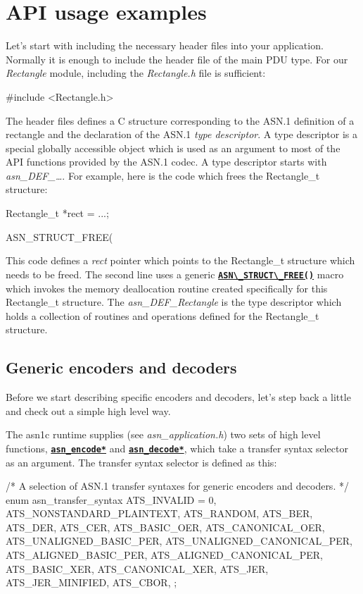 \documentclass[english,oneside,12pt]{book}
\newcommand{\api}[2]{\hyperref[#1]{\code{#2}}}
\newcommand{\code}[1]{\texttt{\textbf{\lstinline{#1}}}}
\begin{document}
\chapter{API usage examples}

Let's start with including the necessary header files into your
application. Normally it is enough to include the header file of
the main PDU type. For our \emph{Rectangle} module, including the \emph{Rectangle.h} file is sufficient:
\begin{codesample}
#include <Rectangle.h>
\end{codesample}
The header files defines a C structure corresponding to the ASN.1
definition of a rectangle and the declaration of the ASN.1
\emph{type descriptor}. A type descriptor is a special globally accessible
object which is used as an argument to most of the API functions provided by
the ASN.1 codec. A type descriptor starts with \emph{asn\_DEF\_\ldots{}}. For example, here is the code which frees the Rectangle\_t structure:
\begin{codesample}
Rectangle_t *rect = ...;

ASN_STRUCT_FREE(%
\end{codesample}
This code defines a \emph{rect} pointer which points to the Rectangle\_t
structure which needs to be freed. The second line uses a generic
\api{sec:ASN_STRUCT_FREE}{ASN\_STRUCT\_FREE()} macro which invokes the memory deallocation routine
created specifically for this Rectangle\_t structure.
The \emph{asn\_DEF\_Rectangle} is the type descriptor which holds
a collection of routines and operations defined for the Rectangle\_t structure.

\section{\label{sec:Generic-Encoding}Generic encoders and decoders}

Before we start describing specific encoders and decoders, let's step back
a little and check out a simple high level way.

The asn1c runtime supplies (see \emph{asn\_application.h}) two sets of high level functions, \api{sec:asn_encode}{asn_encode*} and \api{sec:asn_decode}{asn_decode*}, which take a transfer syntax selector as an argument. The transfer syntax selector is defined as this:

\begin{codesample}[basicstyle=\scriptsize\listingfont]
/* A selection of ASN.1 transfer syntaxes for generic encoders and decoders. */
enum asn_transfer_syntax {
    ATS_INVALID = 0,
    ATS_NONSTANDARD_PLAINTEXT,
    ATS_RANDOM,
    ATS_BER,
    ATS_DER,
    ATS_CER,
    ATS_BASIC_OER,
    ATS_CANONICAL_OER,
    ATS_UNALIGNED_BASIC_PER,
    ATS_UNALIGNED_CANONICAL_PER,
    ATS_ALIGNED_BASIC_PER,
    ATS_ALIGNED_CANONICAL_PER,
    ATS_BASIC_XER,
    ATS_CANONICAL_XER,
    ATS_JER,
    ATS_JER_MINIFIED,
    ATS_CBOR,
};
\end{codesample}
\end{document}
